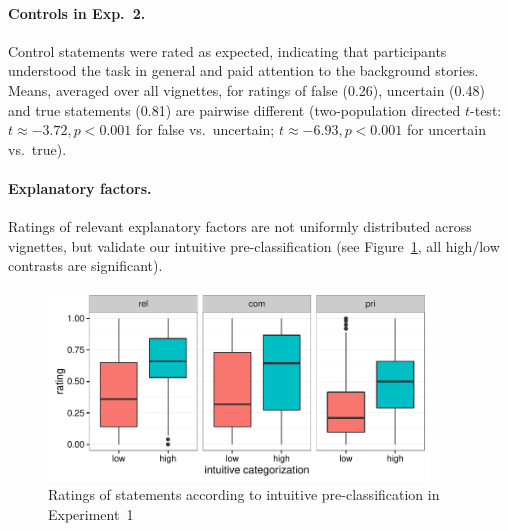 \documentclass[12pt]{article}
\begin{document}
\paragraph{Controls in Exp.\ 2.} Control statements were rated as expected, indicating that participants
understood the task in general and paid attention to the background stories. Means, averaged
over all vignettes, for ratings of false (0.26), uncertain (0.48) and true statements (0.81)
are pairwise different (two-population directed $t$-test: $t \approx - 3.72, p < 0.001$ for
false vs.~uncertain; $t \approx - 6.93, p < 0.001$ for uncertain vs.~true).



  

\paragraph{Explanatory factors.} Ratings of relevant explanatory factors are not uniformly
distributed across vignettes, but validate our intuitive pre-classification (see
Figure~\ref{fig:factorBoxPlots}, all high/low contrasts are significant).

\begin{figure}[t]
  \centering

  \includegraphics[width = 0.9\textwidth]{pics/factorBoxPlotExp1.pdf}
  
  \caption{Ratings of statements according to intuitive pre-classification in Experiment~1}
  \label{fig:factorBoxPlots}
\end{figure}
\end{document}
